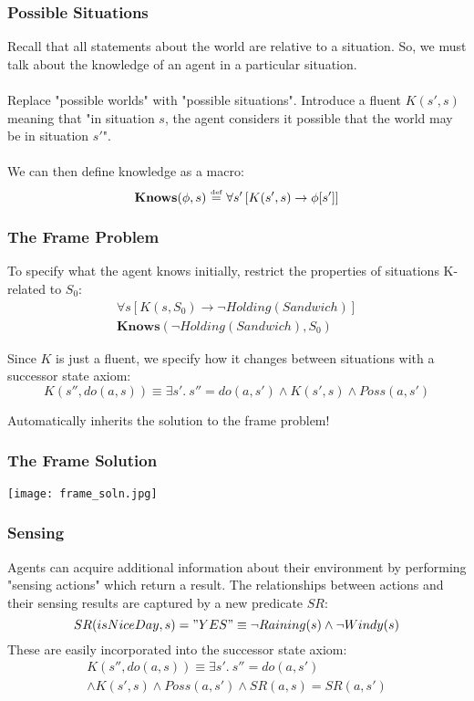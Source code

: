 \documentclass{beamer}
\newcommand{\isdef}{\hbox{$\stackrel{\mbox{\tiny def}}{=}$}}
\begin{document}
\begin{frame}
\frametitle{Possible Situations}
Recall that all statements about the world are relative to a situation.
So, we must talk about the knowledge of an agent in a particular situation.
\ \\
\ \\
\pause
Replace "possible worlds" with "possible situations".  Introduce a fluent
$K(s',s)$ meaning that "in situation $s$, the agent considers it possible
that the world may be in situation $s'$".
\ \\
\ \\
\pause
We can then define knowledge as a macro:
\[ \mathbf{Knows}(\phi,s)\ \isdef\ \forall s'\left[K(s',s)\rightarrow \phi[s']\right] \]

\end{frame}

\begin{frame}
\frametitle{The Frame Problem}
To specify what the agent knows initially, restrict the properties of situations
K-related to $S_0$:
\begin{gather*}
  \forall s \left[K(s,S_0) \rightarrow \neg Holding(Sandwich) \right] \\
  \mathbf{Knows}(\neg Holding(Sandwich),S_0)
\end{gather*}

\pause
Since $K$ is just a fluent, we specify how it changes  between situations
with a successor state axiom:
\begin{equation*}
 K(s'',do(a,s)) \equiv \exists s' . \ s''=do(a,s')
 \wedge K(s',s) \wedge Poss(a,s')
\end{equation*}

Automatically inherits the solution to the frame problem!
\end{frame}

\begin{frame}
\frametitle{The Frame Solution}
\begin{center}
  \texttt{[image: frame\_soln.jpg]}
\end{center}
\end{frame}

\begin{frame}
\frametitle{Sensing}
Agents can acquire additional information about their environment by performing
"sensing actions" which return a result.  The relationships between actions
and their sensing results are captured by a new predicate $SR$:
\begin{equation*}
SR(isNiceDay,s) = "YES" \equiv \neg Raining(s) \wedge \neg Windy(s)
\end{equation*}
These are easily incorporated into the successor state axiom:
\begin{multline*}
 K(s'',do(a,s)) \equiv \exists s' . \ s''=do(a,s') \\
 \wedge K(s',s) \wedge Poss(a,s') \wedge SR(a,s) = SR(a,s')
\end{multline*}
\end{frame}
\end{document}
